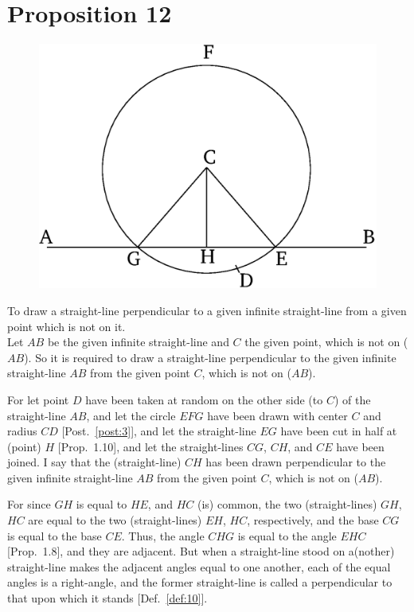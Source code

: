 \chapter*{Proposition 12}
\label{prop:12}

\begin{figure}[ht]
    \begin{center}
    \includegraphics[width=0.5\linewidth]{figures/fig12e.eps}
    \label{fig:prop_12}
    \end{center}
\end{figure}

To draw a straight-line perpendicular to a given infinite straight-line from a given point which is not
on it.\\

Let $AB$ be the given infinite straight-line  and $C$ the given point, which is not
on ($AB$). So it is required to draw a  straight-line  perpendicular to the
given infinite straight-line $AB$ from the given point $C$, which is not on
($AB$).

For let point $D$ have been taken at random on the other side (to $C$) of 
the straight-line $AB$, and let the circle $EFG$ have been drawn
with center $C$ and radius $CD$ [Post.~\ref{post:3}], and let the straight-line $EG$ have been cut
in half at (point) $H$ [Prop.~1.10], and let the straight-lines $CG$, $CH$,
and $CE$ have been joined. I say that the  (straight-line) $CH$ has
been drawn  perpendicular to the given infinite straight-line
$AB$ from the given point $C$, which is not on ($AB$).

For since $GH$ is equal to $HE$, and $HC$ (is) common, the two (straight-lines) $GH$, 
$HC$
are equal to the two (straight-lines) $EH$, $HC$, respectively, and the base $CG$ is
equal to the base $CE$. Thus, the angle $CHG$ is equal to the
angle $EHC$ [Prop.~1.8], and they are adjacent. But when a straight-line
stood on a(nother) straight-line makes the adjacent angles equal to one another, each of the equal angles is a right-angle, and the former straight-line is called a perpendicular to that upon which it stands [Def.~\ref{def:10}].

